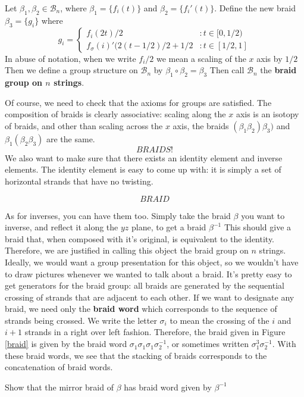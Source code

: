 \begin{definition} Let $\beta_1, \beta_2\in \mathcal{B}_n$, where $\beta_1=\{f_i(t)\}$ and $\beta_2=\{f_i'(t)\}$. Define the new braid $\beta_3=\{g_i\}$ where 
$$g_i= \left\{
\begin{array}{lr} f_i(2t)/2 &:t\in [0,1/2)\\
f_\sigma(i)'(2(t-1/2)/2 +1/2&:t\in [1/2,1]\end{array}\right.$$ 
In abuse of notation, when we write $f_i/2$ we mean a scaling of the $x$ axis by $1/2$ \\
Then we define a group structure on $\mathcal{B}_n$ by $\beta_1 \circ \beta_2 = \beta_3$ Then call $\mathcal{B}_n$ the \textbf{braid group on $n$ strings}. \end{definition}
Of course, we need to check that the axioms for groups are satisfied. The composition of braids is clearly associative: scaling along the $x$ axis is an isotopy of braids, and other than scaling across the $x$ axis, the braids $(\beta_1 \beta_2)\beta_3)$ and $\beta_1(\beta_2\beta_3)$ are the same.
\[
BRAIDS!
\]
We also want to make sure that there exists an identity element and inverse elements. The identity element is easy to come up with: it is simply a set of horizontal strands that have no twisting. 

\[BRAID\]

As for inverses, you can have them too. Simply take the braid $\beta$ you want to inverse, and reflect it along the $yz$ plane, to get a braid $\beta^{-1}$ This should give a braid that, when composed with it's original, is equivalent to the identity. Therefore, we are justified in calling this object the braid group on $n$ strings. Ideally, we would want a group presentation for this object, so we wouldn't have to draw pictures whenever we wanted to talk about a braid. 
It's pretty easy to get generators for the braid group: all braids are generated by the sequential crossing of strands that are adjacent to each other. If we want to designate any braid, we need only the \textbf{braid word} which corresponds to the sequence of strands being crossed. We write the letter $\sigma_i$ to mean the crossing of the $i$ and $i+1$ strands in a right over left fashion. Therefore, the braid given in Figure \ref{braid} is given by the braid word $\sigma_1\sigma_1\sigma_1\sigma_2^{-1}$, or sometimes written $\sigma_1^3\sigma_2^{-1}$. With these braid words, we see that the stacking of braids corresponds to the concatenation of braid words. 
\begin{exercise} Show that the mirror braid of $\beta$ has braid word given by $\beta^{-1}$\end{exercise}

